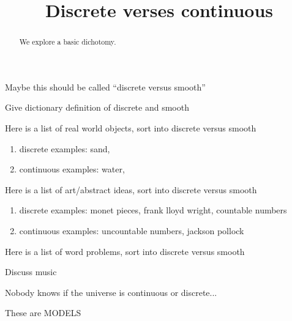 \documentclass[12pt,noauthor,nooutcomes]{ximera}
\author{}
\title{Discrete verses continuous}
\begin{document}
\begin{abstract}
    We explore a basic dichotomy.
\end{abstract}
\maketitle



Maybe this should be called ``discrete versus smooth''



Give dictionary definition of discrete and smooth


\begin{question}
    Here is a list of real world objects, sort into discrete versus smooth
    \begin{enumerate}
    \item discrete examples: sand, 
    \item continuous examples: water,
    \end{enumerate}
\end{question}




\begin{question}
   
    Here is a list of art/abstract ideas, sort into discrete versus smooth
    \begin{enumerate}
    \item discrete examples: monet pieces, frank lloyd wright, countable numbers
    \item continuous examples: uncountable numbers, jackson pollock
    \end{enumerate}
\end{question}



\begin{question}
       Here is a list of word problems, sort into discrete versus smooth

\end{question}


\begin{question}
Discuss music

\end{question}



\begin{question}
Nobody knows if the universe is continuous or discrete... 

These are MODELS
\end{question}
\end{document}
